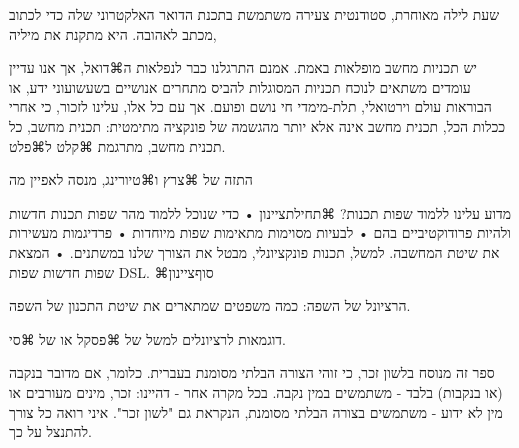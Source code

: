 שעת לילה מאוחרת, סטודנטית צעירה משתמשת בתכנת הדואר האלקטרוני שלה 
כדי לכתוב מכתב לאהובה. 
היא מתקנת את מיליה, 


יש תכניות מחשב מופלאות באמת. 
אמנם התרגלנו כבר לנפלאות ה⌘דואל, אך אנו עדיין עומדים משתאים 
   לנוכח תכניות המסוגלות להביס מתחרים אנושיים בשעשועוני ידע, 
   או הבוראות עולם וירטואלי, תלת-מימדי חי נושם ופועם. 
אך עם כל אלו, עלינו לזכור, כי אחרי ככלות הכל, תכנית מחשב אינה אלא
  יותר מהגשמה של פונקציה מתימטית: 
  תכנית מחשב, כל תכנית מחשב, מתרגמת ⌘קלט ל⌘פלט.
  
התזה של ⌘צרץ ו⌘טיורינג, מנסה לאפיין מה


מדוע עלינו ללמוד שפות תכנות?
⌘תחילת{ציינון}
• כדי שנוכל ללמוד מהר שפות תכנות חדשות ולהיות פרודוקטיביים בהם
• לבעיות מסוימות מתאימות שפות מיוחדות
• פרדיגמות מעשירות את שיטת המחשבה.
למשל, תכנות פונקציונלי, מבטל את הצורך שלנו במשתנים.
• המצאת שפות חדשות
שפות DSL.
⌘סוף{ציינון}

הרציונל של השפה: כמה משפטים שמתארים את שיטת התכנון של השפה.

דוגמאות לרציונלים למשל של ⌘פסקל או של ⌘סי.


ספר זה מנוסח בלשון זכר, כי זוהי הצורה הבלתי מסומנת בעברית. כלומר, אם מדובר בנקבה (או בנקבות) בלבד - משתמשים במין נקבה. בכל מקרה אחר - דהיינו: זכר, מינים מעורבים או מין לא ידוע - משתמשים בצורה הבלתי מסומנת, הנקראת גם "לשון זכר". איני רואה כל צורך להתנצל על כך. 

